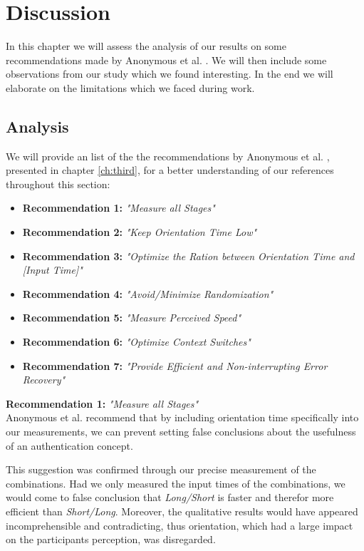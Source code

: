 
\chapter{Discussion}\label{ch:sixth}

In this chapter we will assess the analysis of our results on some recommendations made by Anonymous et al. \cite{anonymous}. We will then include some observations from our study which we found interesting. In the end we will elaborate on the limitations which we faced during work.

\section{Analysis}

We will provide an list of the the recommendations by Anonymous et al. \cite{anonymous}, presented in chapter \ref{ch:third}, for a better understanding of our references throughout this section: 

\begin{itemize}
    \item \textbf{Recommendation 1:} \textit{"Measure all Stages"}
    \item \textbf{Recommendation 2:} \textit{"Keep Orientation Time Low"}
    \item \textbf{Recommendation 3:} \textit{"Optimize the Ration between Orientation Time and [Input Time]"} 
    \item \textbf{Recommendation 4:} \textit{"Avoid/Minimize Randomization"}
    \item \textbf{Recommendation 5:} \textit{"Measure Perceived Speed"}
    \item \textbf{Recommendation 6:} \textit{"Optimize Context Switches"}
    \item \textbf{Recommendation 7:} \textit{"Provide Efficient and Non-interrupting Error Recovery"}
\end{itemize}



\textbf{Recommendation 1:} \textit{"Measure all Stages"}\\
Anonymous et al. \cite{anonymous} recommend that by including orientation time specifically into our measurements, we can prevent setting false conclusions about the usefulness of an authentication concept. 

This suggestion was confirmed through our precise measurement of the combinations. Had we only measured the input times of the combinations, we would come to false conclusion that \textit{Long/Short} is faster and therefor more efficient than \textit{Short/Long}. Moreover, the qualitative results would have appeared incomprehensible and contradicting, thus orientation, which had a large impact on the participants perception, was disregarded. \\


